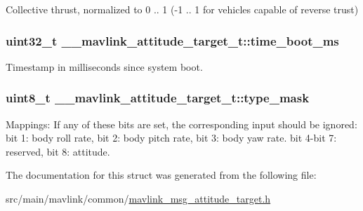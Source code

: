 Collective thrust, normalized to 0 .. 1 (-\/1 .. 1 for vehicles capable of reverse trust) 

\hypertarget{struct____mavlink__attitude__target__t_a30f03ea01450aa75dbe6e874862af65f}{
\subsubsection[{time\+\_\+boot\+\_\+ms}]{\setlength{\rightskip}{0pt plus 5cm}uint32\+\_\+t \+\_\+\+\_\+mavlink\+\_\+attitude\+\_\+target\+\_\+t\+::time\+\_\+boot\+\_\+ms}}\label{struct____mavlink__attitude__target__t_a30f03ea01450aa75dbe6e874862af65f}


Timestamp in milliseconds since system boot. 

\hypertarget{struct____mavlink__attitude__target__t_a7e13f53152b3b1d8eda9a8bd1e7dce02}{
\subsubsection[{type\+\_\+mask}]{\setlength{\rightskip}{0pt plus 5cm}uint8\+\_\+t \+\_\+\+\_\+mavlink\+\_\+attitude\+\_\+target\+\_\+t\+::type\+\_\+mask}}\label{struct____mavlink__attitude__target__t_a7e13f53152b3b1d8eda9a8bd1e7dce02}


Mappings\+: If any of these bits are set, the corresponding input should be ignored\+: bit 1\+: body roll rate, bit 2\+: body pitch rate, bit 3\+: body yaw rate. bit 4-\/bit 7\+: reserved, bit 8\+: attitude. 



The documentation for this struct was generated from the following file\+:\begin{DoxyCompactItemize}
\item 
src/main/mavlink/common/\hyperlink{mavlink__msg__attitude__target_8h}{mavlink\+\_\+msg\+\_\+attitude\+\_\+target.\+h}\end{DoxyCompactItemize}
